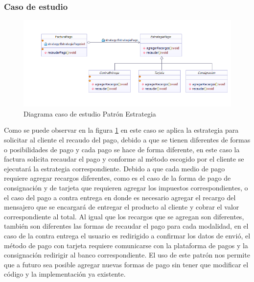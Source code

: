 \subsubsection{Caso de estudio}

\begin{figure}[th!]
	\centering
	\includegraphics[width=1.0\linewidth]{arquitectura/imagenes/DiagramaEstrategia}
	\caption{Diagrama caso de estudio Patrón Estrategia}
	\label{fig:patronEstrategia}
\end{figure}


Como se puede observar en la figura \ref{fig:patronEstrategia} en este caso se aplica la estrategia para solicitar al cliente el recaudo del pago, debido a que se tienen diferentes de formas o posibilidades de pago y cada pago se hace de forma diferente, en este caso la factura solicita recaudar el  pago y conforme al método escogido por el cliente se ejecutará la estrategia correspondiente.\newline
Debido a que cada medio de pago requiere agregar recargos diferentes, como es el caso de la forma de pago de consignación y de tarjeta que requieren agregar los impuestos correspondientes, o el caso del pago a contra entrega en donde es necesario agregar el recargo del mensajero que se encargará de entregar el producto al cliente y cobrar el valor correspondiente al total.\newline
Al igual que los recargos que se agregan son diferentes, también son diferentes las formas de recaudar el pago para cada modalidad, en el caso de la contra entrega el usuario es redirigido a confirmar los datos de envió, el método de pago con tarjeta requiere comunicarse con la plataforma de pagos y la consignación redirigir al banco correspondiente.\newline
El uso de este patrón nos permite que a futuro sea posible agregar nuevas formas de pago sin tener que modificar el código y la implementación ya existente.





